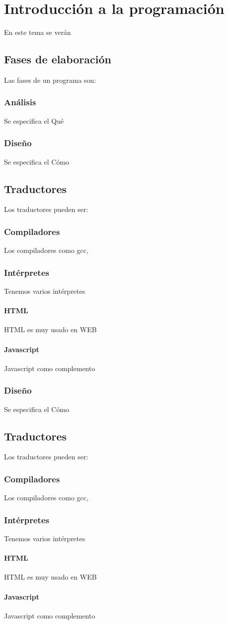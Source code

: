 \documentclass[10pt,a4paper]{book}
\begin{document}
  \chapter{Introducción a la programación}
     En este tema se verán
     \section{Fases de elaboración}
        Las fases de un programa son:
        \subsection{Análisis}
           Se especifica el Qué
        \subsection{Diseño}
           Se especifica el Cómo     
     \section{Traductores}
        Los traductores pueden ser:
        \subsection{Compiladores}
          Los compiladores como gcc,
        \subsection{Intérpretes}
          Tenemos varios intérpretes
          \subsubsection{HTML}
            HTML es muy usado en WEB
          \subsubsection{Javascript}
            Javascript como complemento 
        \subsection{Diseño}
          Se especifica el Cómo     
      \section{Traductores}
         Los traductores pueden ser:
         \subsection{Compiladores}
           Los compiladores como gcc,
         \subsection{Intérpretes}
           Tenemos varios intérpretes
           \subsubsection{HTML}
              HTML es muy usado en WEB
           \subsubsection{Javascript}
              Javascript como complemento 
\end{document}
